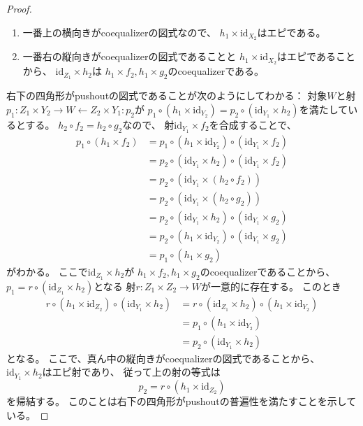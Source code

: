 \documentclass[uplatex]{jsarticle}
\theoremstyle{definition}
\def\id{\mathrm{id}}
\begin{document}
\begin{proof}
\begin{enumerate}
    \item
    一番上の横向きがcoequalizerの図式なので、
    \(h_1\times \id_{X_2}\)はエピである。
    \item
    一番右の縦向きがcoequalizerの図式であることと
    \(h_1\times \id_{X_2}\)はエピであることから、
    \(\id_{Z_1}\times h_2\)は
    \(h_1\times f_2, h_1\times g_2\)のcoequalizerである。
  \end{enumerate}
  右下の四角形がpushoutの図式であることが次のようにしてわかる：
  対象\(W\)と射\(p_1 : Z_1\times Y_2 \to W \gets Z_2\times Y_1 : p_2\)が
  \(p_1\circ (h_1\times \id_{Y_2}) = p_2\circ (\id_{Y_1}\times h_2)\)を満たしているとする。
  \(h_2\circ f_2 = h_2\circ g_2\)なので、
  射\(\id_{Y_1}\times f_2\)を合成することで、
  \begin{align*}
    p_1 \circ (h_1 \times f_2)
    &= p_1\circ (h_1\times \id_{Y_2}) \circ (\id_{Y_1}\times f_2) \\
    &= p_2\circ (\id_{Y_1}\times h_2) \circ (\id_{Y_1}\times f_2) \\
    &= p_2\circ (\id_{Y_1}\times (h_2\circ f_2)) \\
    &= p_2\circ (\id_{Y_1}\times (h_2\circ g_2)) \\
    &= p_2\circ (\id_{Y_1}\times h_2) \circ (\id_{Y_1}\times g_2) \\
    &= p_2\circ (h_1\times \id_{Y_2}) \circ (\id_{Y_1}\times g_2) \\
    &= p_1\circ (h_1\times g_2)
  \end{align*}
  がわかる。
  ここで\(\id_{Z_1}\times h_2\)が
  \(h_1\times f_2, h_1\times g_2\)のcoequalizerであることから、
  \(p_1 = r\circ (\id_{Z_1}\times h_2)\)となる
  射\(r:Z_1\times Z_2 \to W\)が一意的に存在する。
  このとき
  \begin{align*}
    r \circ (h_1\times\id_{Z_2}) \circ (\id_{Y_1}\times h_2)
    &= r\circ (\id_{Z_1}\times h_2) \circ (h_1\times\id_{Y_2}) \\
    &= p_1 \circ (h_1\times\id_{Y_2}) \\
    &= p_2 \circ (\id_{Y_1}\times h_2)
  \end{align*}
  となる。
  ここで、真ん中の縦向きがcoequalizerの図式であることから、
  \(\id_{Y_1}\times h_2\)はエピ射であり、
  従って上の射の等式は
  \[
  p_2 = r \circ (h_1\times\id_{Z_2})
  \]
  を帰結する。
  このことは右下の四角形がpushoutの普遍性を満たすことを示している。


\end{proof}
\end{document}
